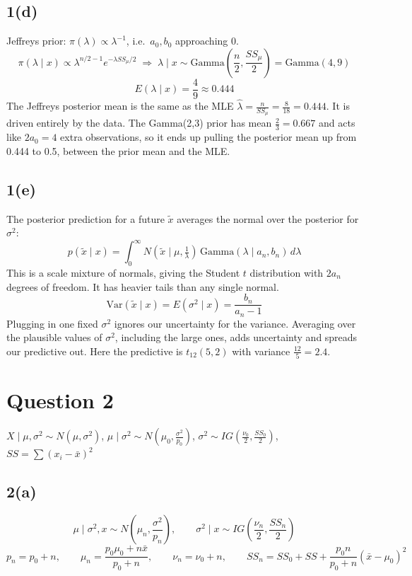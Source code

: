 \documentclass[11pt]{article}
\begin{document}
\subsection*{1(d)}
Jeffreys prior: $\pi(\lambda)\propto \lambda^{-1}$, i.e.\ $a_0, b_0$ approaching 0.
\[
\pi(\lambda\mid x) \propto \lambda^{n/2-1} e^{-\lambda SS_\mu/2}
\;\Rightarrow\;
\lambda\mid x \sim \text{Gamma}\left(\frac{n}{2},\frac{SS_\mu}{2}\right) = \text{Gamma}(4,9)
\]
\[
E(\lambda\mid x) = \frac{4}{9} \approx 0.444
\]
The Jeffreys posterior mean is the same as the MLE $\hat\lambda = \frac{n}{SS_\mu} = \frac{8}{18} = 0.444$. It is driven entirely by the data. The Gamma(2,3) prior has mean $\frac{2}{3} = 0.667$ and acts like $2a_0 = 4$ extra observations, so it ends up pulling the posterior mean up from 0.444 to 0.5, between the prior mean and the MLE.

\subsection*{1(e)}
The posterior prediction for a future $\tilde{x}$ averages the normal over the posterior for $\sigma^2$:
\[
p(\tilde{x}\mid x) = \int_0^\infty N\left(\tilde{x}\mid \mu, \tfrac{1}{\lambda}\right)\,\text{Gamma}(\lambda\mid a_n,b_n)\,d\lambda
\]
This is a scale mixture of normals, giving the Student $t$ distribution with $2a_n$ degrees of freedom. It has heavier tails than any single normal.
\[
\text{Var}(\tilde{x}\mid x) = E(\sigma^2\mid x) = \frac{b_n}{a_n-1}
\]
Plugging in one fixed $\sigma^2$ ignores our uncertainty for the variance. Averaging over the plausible values of $\sigma^2$, including the large ones, adds uncertainty and spreads our predictive out. Here the predictive is $t_{12}(5, 2)$ with variance $\frac{12}{5} = 2.4$.

\section*{Question 2}

$X\mid\mu,\sigma^2 \sim N(\mu,\sigma^2)$, \quad $\mu\mid\sigma^2 \sim N\left(\mu_0,\frac{\sigma^2}{p_0}\right)$, \quad $\sigma^2 \sim IG\left(\frac{\nu_0}{2},\frac{SS_0}{2}\right)$, \quad $SS = \sum(x_i-\bar{x})^2$

\subsection*{2(a)}
\[
\mu\mid\sigma^2,x \sim N\left(\mu_n,\frac{\sigma^2}{p_n}\right), \qquad \sigma^2\mid x \sim IG\left(\frac{\nu_n}{2},\frac{SS_n}{2}\right)
\]
\[
p_n = p_0 + n, \qquad \mu_n = \frac{p_0\mu_0 + n\bar{x}}{p_0+n}, \qquad \nu_n = \nu_0 + n, \qquad SS_n = SS_0 + SS + \frac{p_0 n}{p_0+n}(\bar{x}-\mu_0)^2
\]
\end{document}
